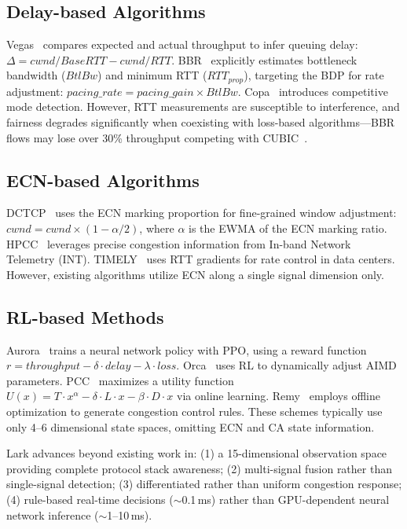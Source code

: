\documentclass[10pt,twocolumn]{article}
\begin{document}
\subsection{Delay-based Algorithms}

Vegas~\cite{vegas} compares expected and actual throughput to infer queuing delay: $\Delta = cwnd/BaseRTT - cwnd/RTT$. BBR~\cite{bbr} explicitly estimates bottleneck bandwidth ($BtlBw$) and minimum RTT ($RTT_{prop}$), targeting the BDP for rate adjustment: $pacing\_rate = pacing\_gain \times BtlBw$. Copa~\cite{copa} introduces competitive mode detection. However, RTT measurements are susceptible to interference, and fairness degrades significantly when coexisting with loss-based algorithms---BBR flows may lose over 30\% throughput competing with CUBIC~\cite{bbrfairness}.

\subsection{ECN-based Algorithms}

DCTCP~\cite{dctcp} uses the ECN marking proportion for fine-grained window adjustment: $cwnd = cwnd \times (1 - \alpha/2)$, where $\alpha$ is the EWMA of the ECN marking ratio. HPCC~\cite{hpcc} leverages precise congestion information from In-band Network Telemetry (INT). TIMELY~\cite{timely} uses RTT gradients for rate control in data centers. However, existing algorithms utilize ECN along a single signal dimension only.

\subsection{RL-based Methods}

Aurora~\cite{aurora} trains a neural network policy with PPO, using a reward function $r = throughput - \delta \cdot delay - \lambda \cdot loss$. Orca~\cite{orca} uses RL to dynamically adjust AIMD parameters. PCC~\cite{pcc} maximizes a utility function $U(x) = T \cdot x^{\alpha} - \delta \cdot L \cdot x - \beta \cdot D \cdot x$ via online learning. Remy~\cite{remy} employs offline optimization to generate congestion control rules. These schemes typically use only 4--6 dimensional state spaces, omitting ECN and CA state information.

Lark advances beyond existing work in: (1) a 15-dimensional observation space providing complete protocol stack awareness; (2) multi-signal fusion rather than single-signal detection; (3) differentiated rather than uniform congestion response; (4) rule-based real-time decisions ($\sim$0.1\,ms) rather than GPU-dependent neural network inference ($\sim$1--10\,ms).
\end{document}
